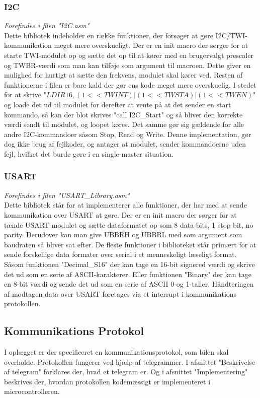 \subsubsection{I2C}
\textit{Forefindes i filen "I2C.asm"}\\
Dette bibliotek indeholder en række funktioner, der forsøger at gøre I2C/TWI- kommunikation meget mere overskueligt. Der er en init macro der sørger for at starte TWI-modulet op og sætte det op til at kører med en brugervalgt prescaler og TWBR-værdi som man kan tilføje som argument til macroen. Dette giver en mulighed for hurtigt at sætte den frekvens, modulet skal kører ved. Resten af funktionerne i filen er bare kald der gør ens kode meget mere overskuelig. I stedet for at skrive "$LDI R16,(1<<TWINT)|(1<<TWSTA)|(1<<TWEN)$" og loade det ud til modulet for derefter at vente på at det sender en start kommando, så kan der blot skrives "call I2C\_Start" og så bliver den korrekte værdi sendt til modulet, og loopet køres. Det samme gør sig gældende for alle andre I2C-kommandoer såsom Stop, Read og Write. Denne implementation, gør dog ikke brug af fejlkoder, og antager at modulet, sender kommandoerne uden fejl, hvilket det burde gøre i en single-master situation.

\subsubsection{USART}
\textit{Forefindes i filen "USART\_Library.asm"}\\
Dette bibliotek står for at implementerer alle funktioner, der har med at sende kommunikation over USART at gøre. Der er en init macro der sørger for at tænde USART-modulet og sætte dataformatet op som 8 data-bits, 1 stop-bit, no parity. Derudover kan man give UBBRH og UBBRL med som argument som baudraten så bliver sat efter. De fleste funktioner i biblioteket står primært for at sende forskellige data formater over serial i et menneskeligt læseligt format. Såsom funktionen "Decimal\_S16" der kan tage en 16-bit signered værdi og skrive det ud som en serie af ASCII-karakterer. Eller funktionen "Binary" der kan tage en 8-bit værdi og sende det ud som en serie af ASCII 0-og 1-taller. Håndteringen af modtagen data over USART foretages via et interrupt i kommunikations protokollen.

\subsection{Kommunikations Protokol}
I oplægget er der specificeret en kommunikationsprotokol, som bilen skal overholde. Protokollen fungerer ved hjælp af telegrammer. I afsnittet "Beskrivelse af telegram" forklares der, hvad et telegram er. Og i afsnittet "Implementering" beskrives der, hvordan protokollen kodemæssigt er implementeret i microcontrolleren.

